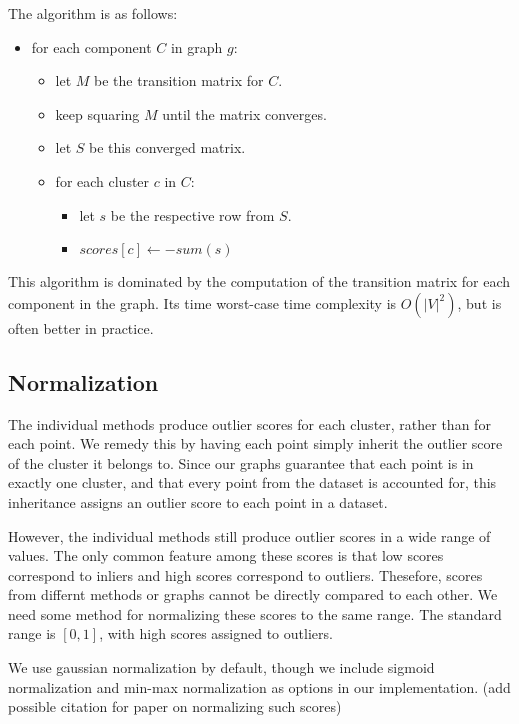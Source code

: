 The algorithm is as follows:

\begin{itemize}
    \item for each component $C$ in graph $g$:
    \begin{itemize}
        \item let $M$ be the transition matrix for $C$.
        \item keep squaring $M$ until the matrix converges.
        \item let $S$ be this converged matrix.
        \item for each cluster $c$ in $C$:
        \begin{itemize}
            \item let $s$ be the respective row from $S$.
            \item $scores[c] \leftarrow -sum(s)$
        \end{itemize}
    \end{itemize}
\end{itemize}

This algorithm is dominated by the computation of the transition matrix for each component in the graph.
Its time worst-case time complexity is $O(|V|^2)$, but is often better in practice.


\subsection{Normalization}\label{subsec:methods:normalization}
The individual methods produce outlier scores for each cluster, rather than for each point.
We remedy this by having each point simply inherit the outlier score of the cluster it belongs to.
Since our graphs guarantee that each point is in exactly one cluster, and that every point from the dataset is accounted for, this inheritance assigns an outlier score to each point in a dataset.

However, the individual methods still produce outlier scores in a wide range of values.
The only common feature among these scores is that low scores correspond to inliers and high scores correspond to outliers.
Thesefore, scores from differnt methods or graphs cannot be directly compared to each other.
We need some method for normalizing these scores to the same range.
The standard range is $[0, 1]$, with high scores assigned to outliers.

We use gaussian normalization by default, though we include sigmoid normalization and min-max normalization as options in our implementation. (add possible citation for paper on normalizing such scores)

